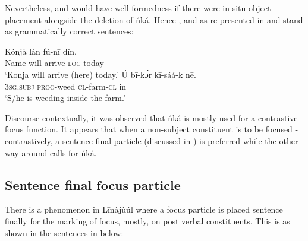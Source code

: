 \documentclass[output=paper,colorlinks,citecolor=brown]{langscibook}
\begin{document}
Nevertheless,  and  would have well-formedness if there were in situ object placement alongside the deletion of ńká. Hence , and  as re-presented in  and  stand as grammatically correct sentences:

\ea%
    \label{ex:bisilki:16}
    \ea\label{ex:bisilki:16a}
    \gll    Kónjà		lán	fú-nī		dín.\\
            Name		will	arrive\textsc{-loc}	today\\
    \glt    ‘Konja will arrive (here) today.’
    \ex\label{ex:bisilki:16b}
    \gll    Ú		bī-kɔ́r 		kī-sáá-k	nē.\\
            \textsc{3sg.subj}	\textsc{prog-}weed 		\textsc{cl-}farm\textsc{-cl}	in\\
    \glt    ‘S/he is weeding inside the farm.’
    \z
\z

Discourse contextually, it was observed that ńká is mostly used for a contrastive focus function. It appears that when a non-subject constituent is to be focused -contrastively, a sentence final particle (discussed in ) is preferred while the other way around calls for ńká.

\subsection{Sentence final focus particle}\label{sec:bisilki:5.3}

There is a phenomenon in Līnàjùúl where a focus particle is placed sentence finally for the marking of focus, mostly, on post verbal constituents. This is as shown in the sentences in  below:
\end{document}
